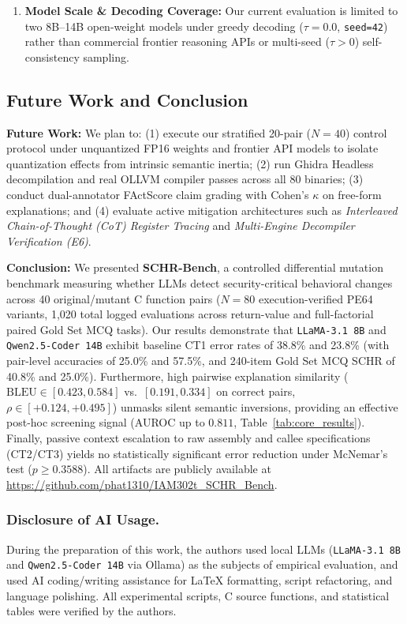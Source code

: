 \documentclass[runningheads]{llncs}
\begin{document}
\begin{enumerate}
    \item \textbf{Model Scale \& Decoding Coverage:} Our current evaluation is limited to two 8B--14B open-weight models under greedy decoding ($\tau = 0.0$, \texttt{seed=42}) rather than commercial frontier reasoning APIs or multi-seed ($\tau > 0$) self-consistency sampling.
\end{enumerate}

\subsection{Future Work and Conclusion}
\textbf{Future Work:} We plan to: (1) execute our stratified 20-pair ($N=40$) control protocol under unquantized FP16 weights and frontier API models to isolate quantization effects from intrinsic semantic inertia; (2) run Ghidra Headless decompilation and real OLLVM compiler passes across all 80 binaries; (3) conduct dual-annotator FActScore claim grading with Cohen's $\kappa$ on free-form explanations; and (4) evaluate active mitigation architectures such as \textit{Interleaved Chain-of-Thought (CoT) Register Tracing} and \textit{Multi-Engine Decompiler Verification (E6)}.

\textbf{Conclusion:} We presented \textbf{SCHR-Bench}, a controlled differential mutation benchmark measuring whether LLMs detect security-critical behavioral changes across 40 original/mutant C function pairs ($N=80$ execution-verified PE64 variants, 1,020 total logged evaluations across return-value and full-factorial paired Gold Set MCQ tasks). Our results demonstrate that \texttt{LLaMA-3.1 8B} and \texttt{Qwen2.5-Coder 14B} exhibit baseline CT1 error rates of 38.8\% and 23.8\% (with pair-level accuracies of 25.0\% and 57.5\%, and 240-item Gold Set MCQ SCHR of 40.8\% and 25.0\%). Furthermore, high pairwise explanation similarity ($\text{BLEU} \in [0.423, 0.584]$ vs.\ $[0.191, 0.334]$ on correct pairs, $\rho \in [+0.124, +0.495]$) unmasks silent semantic inversions, providing an effective post-hoc screening signal (AUROC up to $0.811$, Table~\ref{tab:core_results}). Finally, passive context escalation to raw assembly and callee specifications (CT2/CT3) yields no statistically significant error reduction under McNemar's test ($p \ge 0.3588$). All artifacts are publicly available at \url{https://github.com/phat1310/IAM302t_SCHR_Bench}.

\subsubsection*{Disclosure of AI Usage.} During the preparation of this work, the authors used local LLMs (\texttt{LLaMA-3.1 8B} and \texttt{Qwen2.5-Coder 14B} via Ollama) as the subjects of empirical evaluation, and used AI coding/writing assistance for LaTeX formatting, script refactoring, and language polishing. All experimental scripts, C source functions, and statistical tables were verified by the authors.



\end{document}
